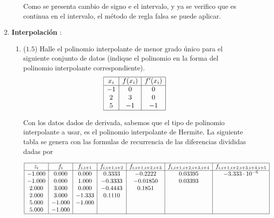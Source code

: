 \documentclass[12pt]{article}
\begin{document}
\begin{enumerate}[leftmargin=*,widest=9]
\begin{enumerate}[label=\alph*]
    Como se presenta cambio de signo e el intervalo, y ya se verifico que es continua en el intervalo, el método de regla falsa se puede aplicar.
    
    \end{enumerate}

    \item \textbf{Interpolación} :
    
    \begin{enumerate}[label=\alph*]
    \item ($1.5$) Halle el polinomio interpolante de menor grado único para el siguiente conjunto de datos (indique el polinomio en la forma del polinomio interpolante correspondiente).
    \[
    \begin{array}{|c|c|c|}
    \hline
    x_i & f(x_i) & f^\prime(x_i)\\
    \hline
    -1 & 0 & 0 \\
    2 & 3 & 0\\
    5 & -1 & -1\\
    \hline 
    \end{array}
    \]
    
    
    Con los datos dados de derivada, sabemos que el tipo de polinomio interpolante a usar, es el polinomio interpolante de Hermite. La siguiente tabla se genera con las formulas de recurrencia de las diferencias divididas dadas por 
 
    
    \[
    \begin{array}{|c|c|c|c|c|c|c|}
    \hline
    z_i & f_i & f_{i, i + 1} & f_{i, i+1, i+2} & f_{i, i+1, i+2, i+3} & f_{i, i+1, i+2, i+3, i+4} & f_{i, i+1, i+2, i+3, i+4, i+5}\\
    \hline
    -1.000 & 0.000 & 0.000 & 0.3333 & -0.2222 & 0.03395 & -3.333\cdot 10^{-6} \\
    -1.000 & 0.000 & 1.000 & -0.3333 & -0.01850 & 0.03393 & \\
    2.000 & 3.000 & 0.000  & -0.4443 & 0.1851 && \\
    2.000 & 3.000 & -1.333  & 0.1110 &&& \\
    5.000 & -1.000 & -1.000 &&&& \\
    5.000 & -1.000 &&&&& \\
    \hline
    \end{array}
    \]
    

\end{enumerate}
\end{enumerate}
\end{document}
